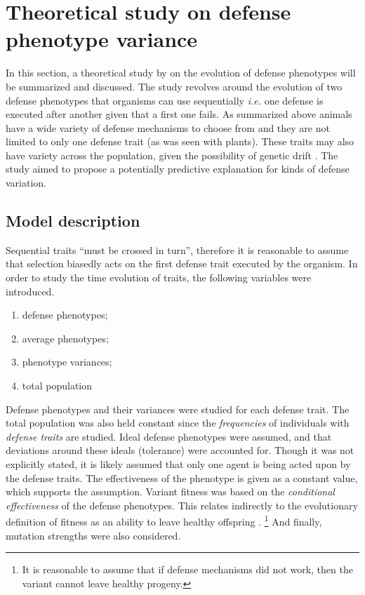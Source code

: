 \section{Theoretical study on defense phenotype variance}
In this section, a theoretical study by  on the evolution of defense phenotypes will be summarized and discussed.
The study revolves around the evolution of two defense phenotypes that organisms can use sequentially \textit{i.e.} one defense is executed after another given that a first one fails.
As summarized above animals have a wide variety of defense mechanisms to choose from and they are not limited to only one defense trait (as was seen with plants).
These traits may also have variety across the population, given the possibility of genetic drift \cite{Ridley}.
The study aimed to propose a potentially predictive explanation for kinds of defense variation.

\subsection{Model description}
Sequential traits ``must be crossed in turn'', therefore it is reasonable to assume that selection biasedly acts on the first defense trait executed by the organism.
In order to study the time evolution of traits, the following variables were introduced.

\begin{enumerate}
    \item defense phenotypes;
    \item average phenotypes;
    \item phenotype variances;
    \item total population
\end{enumerate}

Defense phenotypes and their variances were studied for each defense trait.
The total population was also held constant since the \emph{frequencies} of individuals with \emph{defense traits} are studied.
Ideal defense phenotypes were assumed, and that deviations around these ideals (tolerance) were accounted for.
Though it was not explicitly stated, it is likely assumed that only one agent is being acted upon by the defense traits.
The effectiveness of the phenotype is given as a constant value, which supports the assumption.
Variant fitness was based on the \emph{conditional effectiveness} of the defense phenotypes.
This relates indirectly to the evolutionary definition of fitness as an ability to leave healthy offspring \cite{Ridley}.
\footnote{It is reasonable to assume that if defense mechanisms did not work, then the variant cannot leave healthy progeny.}
And finally, mutation strengths were also considered.

